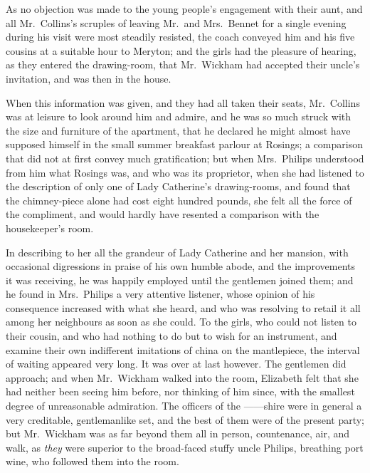 
As no objection was made to the young people’s engagement
with their aunt, and all Mr.\ Collins’s scruples of
leaving Mr.\ and Mrs.\ Bennet for a single evening during
his visit were most steadily resisted, the coach conveyed
him and his five cousins at a suitable hour to Meryton;
and the girls had the pleasure of hearing, as they entered
the drawing-room, that Mr.\ Wickham had accepted their
uncle’s invitation, and was then in the house.

When this information was given, and they had all
taken their seats, Mr.\ Collins was at leisure to look around
him and admire, and he was so much struck with the size
and furniture of the apartment, that he declared he might
almost have supposed himself in the small summer
breakfast parlour at Rosings; a comparison that did not
at first convey much gratification; but when Mrs.\ Philips
understood from him what Rosings was, and who was its
proprietor, when she had listened to the description of
only one of Lady Catherine’s drawing-rooms, and found
that the chimney-piece alone had cost eight hundred
pounds, she felt all the force of the compliment, and would
hardly have resented a comparison with the housekeeper’s
room.

In describing to her all the grandeur of Lady Catherine
and her mansion, with occasional digressions in praise of
his own humble abode, and the improvements it was
receiving, he was happily employed until the gentlemen
joined them; and he found in Mrs.\ Philips a very attentive
listener, whose opinion of his consequence increased with
what she heard, and who was resolving to retail it all
among her neighbours as soon as she could. To the girls,
who could not listen to their cousin, and who had nothing
to do but to wish for an instrument, and examine their
own indifferent imitations of china on the mantlepiece, the
interval of waiting appeared very long. It was over at
last however. The gentlemen did approach; and when
Mr.\ Wickham walked into the room, Elizabeth felt that
she had neither been seeing him before, nor thinking of him
since, with the smallest degree of unreasonable admiration.
The officers of the ------shire were in general a very creditable,
gentlemanlike set, and the best of them were of the
present party; but Mr.\ Wickham was as far beyond them
all in person, countenance, air, and walk, as \textit{they} were
superior to the broad-faced stuffy uncle Philips, breathing
port wine, who followed them into the room.

